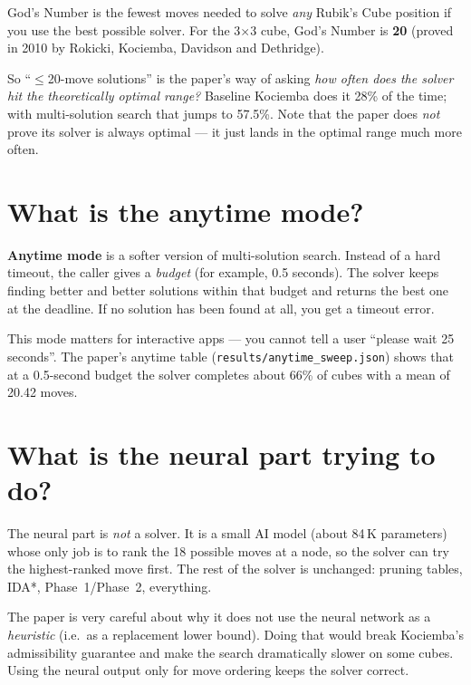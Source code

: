 \documentclass[11pt,a4paper]{article}
\newcommand{\defn}[1]{\textbf{#1}}
\begin{document}
God's Number is the fewest moves needed to solve \emph{any} Rubik's
Cube position if you use the best possible solver. For the 3$\times$3
cube, God's Number is \textbf{20} (proved in 2010 by Rokicki, Kociemba,
Davidson and Dethridge).

So ``$\leq$20-move solutions'' is the paper's way of asking \emph{how
often does the solver hit the theoretically optimal range?} Baseline
Kociemba does it 28\% of the time; with multi-solution search that
jumps to 57.5\%. Note that the paper does \emph{not} prove its solver
is always optimal --- it just lands in the optimal range much more
often.

\section{What is the anytime mode?}

\defn{Anytime mode} is a softer version of multi-solution search.
Instead of a hard timeout, the caller gives a \emph{budget} (for
example, 0.5 seconds). The solver keeps finding better and better
solutions within that budget and returns the best one at the deadline.
If no solution has been found at all, you get a timeout error.

This mode matters for interactive apps --- you cannot tell a user
``please wait 25 seconds''. The paper's anytime table
(\texttt{results/\allowbreak anytime\_sweep.json}) shows that at a
0.5-second budget the solver completes about 66\% of cubes with a mean
of 20.42 moves.

\section{What is the neural part trying to do?}

The neural part is \emph{not} a solver. It is a small AI model (about
84\,K parameters) whose only job is to rank the 18 possible moves at a
node, so the solver can try the highest-ranked move first. The rest of
the solver is unchanged: pruning tables, IDA*, Phase~1/Phase~2,
everything.

The paper is very careful about why it does not use the neural network
as a \emph{heuristic} (i.e.\ as a replacement lower bound). Doing that
would break Kociemba's admissibility guarantee and make the search
dramatically slower on some cubes. Using the neural output only for
move ordering keeps the solver correct.
\end{document}
